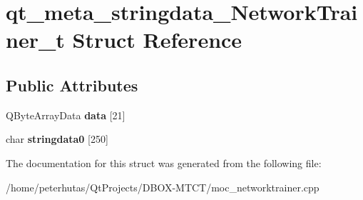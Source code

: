 \hypertarget{structqt__meta__stringdata___network_trainer__t}{}\section{qt\+\_\+meta\+\_\+stringdata\+\_\+\+Network\+Trainer\+\_\+t Struct Reference}
\label{structqt__meta__stringdata___network_trainer__t}
\subsection*{Public Attributes}
\begin{DoxyCompactItemize}
\item 
\mbox{\label{structqt__meta__stringdata___network_trainer__t_af520d05522b64e0a806d0dd92feb9f85}} 
Q\+Byte\+Array\+Data {\bfseries data} \mbox{[}21\mbox{]}
\item 
\mbox{\label{structqt__meta__stringdata___network_trainer__t_a73ca5e26410c8a351fc6ee561ec021c2}} 
char {\bfseries stringdata0} \mbox{[}250\mbox{]}
\end{DoxyCompactItemize}


The documentation for this struct was generated from the following file\+:\begin{DoxyCompactItemize}
\item 
/home/peterhutas/\+Qt\+Projects/\+D\+B\+O\+X-\/\+M\+T\+C\+T/moc\+\_\+networktrainer.\+cpp\end{DoxyCompactItemize}
